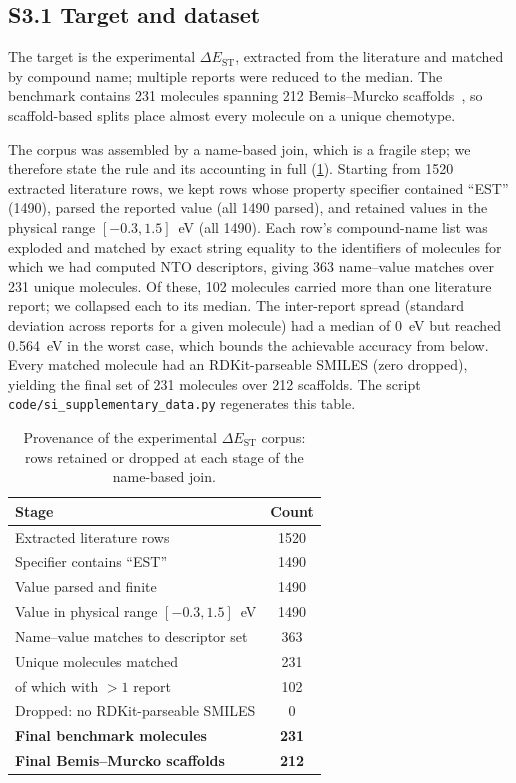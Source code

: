 \documentclass[twoside,twocolumn,9pt]{extarticle}
\begin{document}
\subsection*{S3.1 Target and dataset}
The target is the experimental $\Delta E_\text{ST}$, extracted from the
literature and matched by compound name; multiple reports were reduced to the
median. The benchmark contains \num{231} molecules spanning \num{212}
Bemis--Murcko scaffolds~\cite{Bemis1996}, so scaffold-based splits place almost
every molecule on a unique chemotype.

The corpus was assembled by a name-based join, which is a fragile step; we therefore
state the rule and its accounting in full (\cref{tab:provenance}). Starting from
\num{1520} extracted literature rows, we kept rows whose property specifier
contained ``EST'' (\num{1490}), parsed the reported value (all \num{1490} parsed),
and retained values in the physical range $[-0.3, 1.5]$~eV (all \num{1490}). Each
row's compound-name list was exploded and matched by exact string equality to the
identifiers of molecules for which we had computed NTO descriptors, giving
\num{363} name--value matches over \num{231} unique molecules. Of these,
\num{102} molecules carried more than one literature report; we collapsed each to
its median. The inter-report spread (standard deviation across reports for a given
molecule) had a median of \qty{0}{\electronvolt} but reached
\qty{0.564}{\electronvolt} in the worst case, which bounds the achievable accuracy
from below. Every matched molecule had an RDKit-parseable SMILES (zero dropped),
yielding the final set of \num{231} molecules over \num{212} scaffolds. The script
\texttt{code/si\_supplementary\_data.py} regenerates this table.

\begin{table}[htbp]
  \centering
  \caption{Provenance of the experimental $\Delta E_\text{ST}$ corpus: rows
    retained or dropped at each stage of the name-based join.}
  \label{tab:provenance}
  \footnotesize
  \begin{tabular}{lc}
    \toprule
    Stage & Count \\
    \midrule
    Extracted literature rows                 & 1520 \\
    Specifier contains ``EST''                & 1490 \\
    Value parsed and finite                   & 1490 \\
    Value in physical range $[-0.3,1.5]$~eV   & 1490 \\
    Name--value matches to descriptor set     & 363 \\
    Unique molecules matched                  & 231 \\
    \quad of which with $>1$ report           & 102 \\
    Dropped: no RDKit-parseable SMILES        & 0 \\
    \midrule
    \textbf{Final benchmark molecules}        & \textbf{231} \\
    \textbf{Final Bemis--Murcko scaffolds}    & \textbf{212} \\
    \bottomrule
  \end{tabular}
\end{table}
\end{document}
